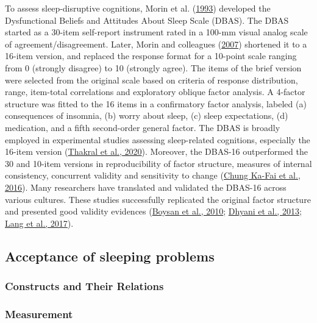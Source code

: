\documentclass[
  ,doc,11pt, twoside,floatsintext]{apa6}
\begin{document}
To assess sleep-disruptive cognitions, Morin et al. (\protect\hyperlink{ref-morin1993insomnia}{1993}) developed the Dysfunctional Beliefs and Attitudes About Sleep Scale (DBAS). The DBAS started as a 30-item self-report instrument rated in a 100-mm visual analog scale of agreement/disagreement. Later, Morin and colleagues (\protect\hyperlink{ref-morin2007a}{2007}) shortened it to a 16-item version, and replaced the response format for a 10-point scale ranging from 0 (strongly disagree) to 10 (strongly agree). The items of the brief version were selected from the original scale based on criteria of response distribution, range, item-total correlations and exploratory oblique factor analysis. A 4-factor structure was fitted to the 16 items in a confirmatory factor analysis, labeled (a) consequences of insomnia, (b) worry about sleep, (c) sleep expectations, (d) medication, and a fifth second-order general factor. The DBAS is broadly employed in experimental studies assessing sleep-related cognitions, especially the 16-item version (\protect\hyperlink{ref-thakral2020}{Thakral et al., 2020}). Moreover, the DBAS-16 outperformed the 30 and 10-item versions in reproducibility of factor structure, measures of internal consistency, concurrent validity and sensitivity to change (\protect\hyperlink{ref-chungka-fai2016}{Chung Ka-Fai et al., 2016}). Many researchers have translated and validated the DBAS-16 across various cultures. These studies successfully replicated the original factor structure and presented good validity evidences (\protect\hyperlink{ref-boysan2010}{Boysan et al., 2010}; \protect\hyperlink{ref-dhyani2013}{Dhyani et al., 2013}; \protect\hyperlink{ref-lang2017}{Lang et al., 2017}).

\hypertarget{acceptance-of-sleeping-problems}{%
\subsection{Acceptance of sleeping problems}\label{acceptance-of-sleeping-problems}}

\hypertarget{constructs-and-their-relations-1}{%
\subsubsection{Constructs and Their Relations}\label{constructs-and-their-relations-1}}

\hypertarget{measurement-1}{%
\subsubsection{Measurement}\label{measurement-1}}
\end{document}
